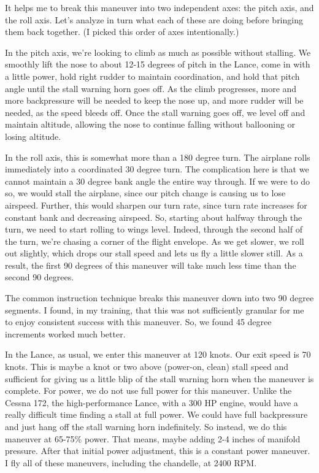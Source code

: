 It helps me to break this maneuver into two independent axes: the pitch axis, and the roll axis. Let's analyze in turn what each of these are doing before bringing them back together. (I picked this order of axes intentionally.)

In the pitch axis, we're looking to climb as much as possible without stalling. We smoothly lift the nose to about 12-15 degrees of pitch in the Lance, come in with a little power, hold right rudder to maintain coordination, and hold that pitch angle until the stall warning horn goes off. As the climb progresses, more and more backpressure will be needed to keep the nose up, and more rudder will be needed, as the speed bleeds off. Once the stall warning goes off, we level off and maintain altitude, allowing the nose to continue falling without ballooning or losing altitude.

In the roll axis, this is somewhat more than a 180 degree turn. The airplane rolls immediately into a coordinated 30 degree turn. The complication here is that we cannot maintain a 30 degree bank angle the entire way through. If we were to do so, we would stall the airplane, since our pitch change is causing us to lose airspeed. Further, this would sharpen our turn rate, since turn rate increases for constant bank and decreasing airspeed. So, starting about halfway through the turn, we need to start rolling to wings level. Indeed, through the second half of the turn, we're chasing a corner of the flight envelope. As we get slower, we roll out slightly, which drops our stall speed and lets us fly a little slower still. As a result, the first 90 degrees of this maneuver will take much less time than the second 90 degrees.

The common instruction technique breaks this maneuver down into two 90 degree segments. I found, in my training, that this was not sufficiently granular for me to enjoy consistent success with this maneuver. So, we found 45 degree increments worked much better.

In the Lance, as usual, we enter this maneuver at 120 knots. Our exit speed is 70 knots. This is maybe a knot or two above (power-on, clean) stall speed and sufficient for giving us a little blip of the stall warning horn when the maneuver is complete. For power, we do not use full power for this maneuver. Unlike the Cessna 172, the high-performance Lance, with a 300 HP engine, would have a really difficult time finding a stall at full power. We could have full backpressure and just hang off the stall warning horn indefinitely. So instead, we do this maneuver at 65-75\% power. That means, maybe adding 2-4 inches of manifold pressure. After that initial power adjustment, this is a constant power maneuver. I fly all of these maneuvers, including the chandelle, at 2400 RPM.

